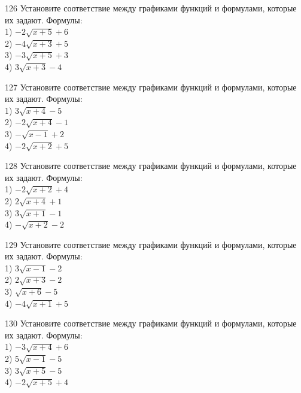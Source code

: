 \documentclass[4apaper]{article}
\begin{document}
\begin{taskBN}{126}
Установите соответствие между графиками функций и формулами, которые их задают. Формулы: \\1) $-2\sqrt{x+5}+6$\\2) $-4\sqrt{x+3}+5$\\3) $-3\sqrt{x+5}+3$\\4) $3\sqrt{x+3}-4$
\end{taskBN}

\begin{taskBN}{127}
Установите соответствие между графиками функций и формулами, которые их задают. Формулы: \\1) $3\sqrt{x+4}-5$\\2) $-2\sqrt{x+4}-1$\\3) $-\sqrt{x-1}+2$\\4) $-2\sqrt{x+2}+5$
\end{taskBN}

\begin{taskBN}{128}
Установите соответствие между графиками функций и формулами, которые их задают. Формулы: \\1) $-2\sqrt{x+2}+4$\\2) $2\sqrt{x+4}+1$\\3) $3\sqrt{x+1}-1$\\4) $-\sqrt{x+2}-2$
\end{taskBN}

\begin{taskBN}{129}
Установите соответствие между графиками функций и формулами, которые их задают. Формулы: \\1) $3\sqrt{x-1}-2$\\2) $2\sqrt{x+3}-2$\\3) $\sqrt{x+6}-5$\\4) $-4\sqrt{x+1}+5$
\end{taskBN}

\begin{taskBN}{130}
Установите соответствие между графиками функций и формулами, которые их задают. Формулы: \\1) $-3\sqrt{x+4}+6$\\2) $5\sqrt{x-1}-5$\\3) $3\sqrt{x+5}-5$\\4) $-2\sqrt{x+5}+4$
\end{taskBN}
\end{document}
